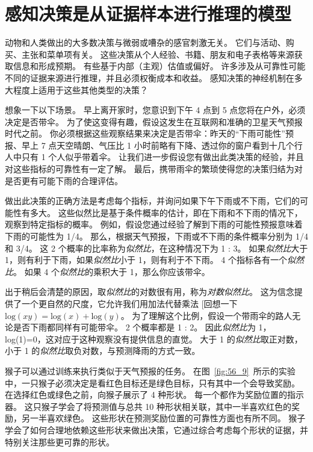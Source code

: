 \section{感知决策是从证据样本进行推理的模型}

动物和人类做出的大多数决策与微弱或嘈杂的感官刺激无关。
它们与活动、购买、主张和菜单项有关。
这些决策从个人经验、书籍、朋友和电子表格等来源获取信息和形成预期。
有些基于内部（主观）估值或偏好。
许多涉及从可靠性可能不同的证据来源进行推理，并且必须权衡成本和收益。
感知决策的神经机制在多大程度上适用于这些其他类型的决策？


想象一下以下场景。
早上离开家时，您意识到下午 4 点到 5 点您将在户外，必须决定是否带伞。
为了使这变得有趣，假设这发生在互联网和准确的卫星天气预报时代之前。
你必须根据这些观察结果来决定是否带伞：昨天的“下雨可能性”预报、早上 7 点天空晴朗、气压比 1 小时前略有下降、透过你的窗户看到十几个行人中只有 1 个人似乎带着伞。
让我们进一步假设您有做出此类决策的经验，并且对这些指标的可靠性有一定了解。
最后，携带雨伞的繁琐使得您的决策归结为对是否更有可能下雨的合理评估。


做出此决策的正确方法是考虑每个指标，并询问如果下午下雨或不下雨，它们的可能性有多大。
这些似然比是基于条件概率的估计，即在下雨和不下雨的情况下，观察到特定指标的概率。
例如，假设您通过经验了解到下雨的可能性预报意味着下雨的可能性为 1/4。
那么，根据天气预报，下雨或不下雨的条件概率分别为 1/4 和 3/4。
这 2 个概率的比率称为\textit{似然比}，在这种情况下为 1 : 3。
如果\textit{似然比}大于 1，则有利于下雨，如果\textit{似然比}小于 1，则有利于不下雨。
4 个指标各有一个\textit{似然比}。
如果 4 个\textit{似然比}的乘积大于 1，那么你应该带伞。


出于稍后会清楚的原因，取\textit{似然比}的对数很有用，称为\textit{对数似然比}。
这为信念提供了一个更自然的尺度，它允许我们用加法代替乘法 [回想一下$\text{log}(xy) = \text{log}(x) + \text{log}(y) $。
为了理解这个比例，假设一个带雨伞的路人无论是否下雨都同样有可能带伞。
2 个概率都是 1 : 2。
因此\textit{似然比}为 1，log(1)=0，这对应于这种观察没有提供信息的直觉。
大于 1 的\textit{似然比}取正对数，小于 1 的\textit{似然比}取负对数，与预测降雨的方式一致。


猴子可以通过训练来执行类似于天气预报的任务。
在图~\ref{fig:56_9}~所示的实验中，一只猴子必须决定是看红色目标还是绿色目标，只有其中一个会导致奖励。
在选择红色或绿色之前，向猴子展示了 4 种形状。
每一个都作为奖励位置的指示器。
这只猴子学会了将预测值与总共 10 种形状相关联，其中一半喜欢红色的奖励，另一半喜欢绿色。
这些形状在预测奖励位置的可靠性方面也有所不同。
猴子学会了如何合理地依赖这些形状来做出决策，它通过综合考虑每个形状的证据，并特别关注那些更可靠的形状。


